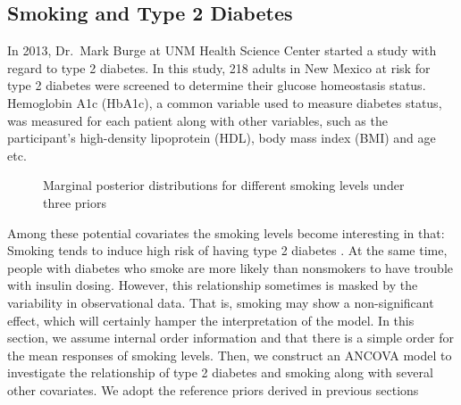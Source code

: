 \documentclass[Proceedings]{ascelike}
\begin{document}
\subsection{Smoking and Type 2 Diabetes}
In 2013, Dr.\ Mark Burge at UNM Health Science Center started a study
with regard to type 2 diabetes. In this study, 218 adults in New
Mexico at risk for type 2 diabetes were screened to determine their
glucose homeostasis status. Hemoglobin A1c (HbA1c), a common variable
used to measure diabetes status, was measured for each patient along
with other variables, such as the participant's high-density
lipoprotein (HDL), body mass index (BMI) and age etc. \\
\begin{figure}[h!]
\centering
{}
\caption{Marginal posterior distributions for different smoking levels under three priors}
\label{fig:HbA1c2}
\end{figure}
Among these potential covariates the smoking levels become interesting
in that: Smoking tends to induce high risk of having type 2 diabetes
\citep{smoking}. At the same time, people with diabetes who smoke are
more likely than nonsmokers to have trouble with insulin
dosing. However, this relationship sometimes is masked by the
variability in observational data. That is, smoking may show a
non-significant effect, which will certainly hamper the interpretation
of the model. In this section, we assume internal order information
and that there is a simple order for the mean responses of smoking
levels. Then, we construct an ANCOVA model to investigate the
relationship of type 2 diabetes and smoking along with several other
covariates. We adopt the reference priors derived in previous sections
\end{document}
